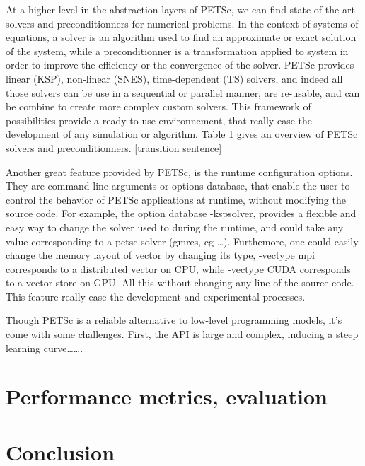 At a higher level in the abstraction layers of PETSc, we can find state-of-the-art solvers and preconditionners for numerical problems. In the context of systems of equations, a solver is an algorithm used to find an approximate or exact solution of the system, while a preconditionner is a transformation applied to system in order to improve the efficiency or the convergence of the solver. PETSc provides  linear (KSP), non-linear (SNES), time-dependent (TS) solvers, and indeed all those solvers can be use in a sequential or parallel manner, are re-usable, and can be combine to create more complex custom solvers. This framework of possibilities provide a ready to use environnement, that really ease the development of any simulation or algorithm.
Table 1 gives an overview of PETSc solvers and preconditionners.  [transition sentence]



Another great feature provided by PETSc, is the runtime configuration options. They are command line arguments or options database, that enable the user to control the behavior of PETSc applications at runtime, without modifying the source code. For example, the option database -kspsolver, provides a flexible and easy way to change the solver used to during the runtime, and could take any value corresponding to a petsc solver (gmres, cg …). Furthemore, one could easily change the memory layout of vector by changing its type, -vectype mpi corresponds to a distributed vector on CPU, while -vectype CUDA corresponds to a vector store on GPU. All this without changing any line of the source code. This feature really ease the development and experimental processes. 



Though PETSc is a reliable alternative to low-level programming models, it’s come with some challenges. First, the API is large and complex, inducing a steep learning curve…….


\section{Performance metrics, evaluation}



\section{Conclusion}



